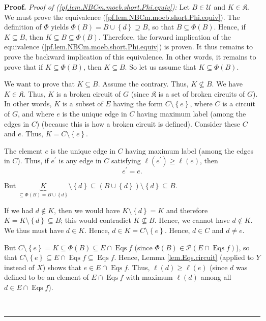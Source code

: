 \documentclass[numbers=enddot,12pt,final,onecolumn,notitlepage]{scrartcl}%
\theoremstyle{definition}
\newenvironment{proof}[1][Proof]{\noindent\textbf{#1.} }{\ \rule{0.5em}{0.5em}}
\newenvironment{vershort}{}{}
\begin{document}
\begin{vershort}
\begin{proof}
\textit{Proof of (\ref{pf.lem.NBCm.moeb.short.Phi.equiv}):} Let $B\in
\mathcal{U}$ and $K\in\mathfrak{K}$. We must prove the equivalence
(\ref{pf.lem.NBCm.moeb.short.Phi.equiv}). The definition of $\Phi$ yields
$\Phi\left(  B\right)  =B\cup\left\{  d\right\}  \supseteq B$, so that
$B\subseteq\Phi\left(  B\right)  $. Hence, if $K\subseteq B$, then $K\subseteq
B\subseteq\Phi\left(  B\right)  $. Therefore, the forward implication of the
equivalence (\ref{pf.lem.NBCm.moeb.short.Phi.equiv}) is proven. It thus
remains to prove the backward implication of this equivalence. In other words,
it remains to prove that if $K\subseteq\Phi\left(  B\right)  $, then
$K\subseteq B$. So let us assume that $K\subseteq\Phi\left(  B\right)  $.

We want to prove that $K\subseteq B$. Assume the contrary. Thus,
$K\not \subseteq B$. We have $K\in\mathfrak{K}$. Thus, $K$ is a broken circuit
of $G$ (since $\mathfrak{K}$ is a set of broken circuits of $G$). In other
words, $K$ is a subset of $E$ having the form $C\setminus\left\{  e\right\}
$, where $C$ is a circuit of $G$, and where $e$ is the unique edge in $C$
having maximum label (among the edges in $C$) (because this is how a broken
circuit is defined). Consider these $C$ and $e$. Thus, $K=C\setminus\left\{
e\right\}  $.

The element $e$ is the unique edge in $C$ having maximum label (among the
edges in $C$). Thus, if $e^{\prime}$ is any edge in $C$ satisfying
$\ell\left(  e^{\prime}\right)  \geq\ell\left(  e\right)  $, then%
\begin{equation}
e^{\prime}=e. \label{pf.lem.NBCm.moeb.short.Phi.equiv.pf.e'}%
\end{equation}


But $\underbrace{K}_{\subseteq\Phi\left(  B\right)  =B\cup\left\{  d\right\}
}\setminus\left\{  d\right\}  \subseteq\left(  B\cup\left\{  d\right\}
\right)  \setminus\left\{  d\right\}  \subseteq B$.

If we had $d\notin K$, then we would have $K\setminus\left\{  d\right\}  =K$
and therefore $K=K\setminus\left\{  d\right\}  \subseteq B$; this would
contradict $K\not \subseteq B$. Hence, we cannot have $d\notin K$. We thus
must have $d\in K$. Hence, $d\in K=C\setminus\left\{  e\right\}  $. Hence,
$d\in C$ and $d\neq e$.

But $C\setminus\left\{  e\right\}  =K\subseteq\Phi\left(  B\right)  \subseteq
E\cap\operatorname*{Eqs}f$ (since $\Phi\left(  B\right)  \in\mathcal{P}\left(
E\cap\operatorname*{Eqs}f\right)  $), so that $C\setminus\left\{  e\right\}
\subseteq E\cap\operatorname*{Eqs}f\subseteq\operatorname*{Eqs}f$. Hence,
Lemma \ref{lem.Eqs.circuit} (applied to $Y$ instead of $X$) shows that $e\in
E\cap\operatorname*{Eqs}f$. Thus, $\ell\left(  d\right)  \geq\ell\left(
e\right)  $ (since $d$ was defined to be an element of $E\cap
\operatorname*{Eqs}f$ with maximum $\ell\left(  d\right)  $ among all $d\in
E\cap\operatorname*{Eqs}f$).


\end{proof}
\end{vershort}
\end{document}
